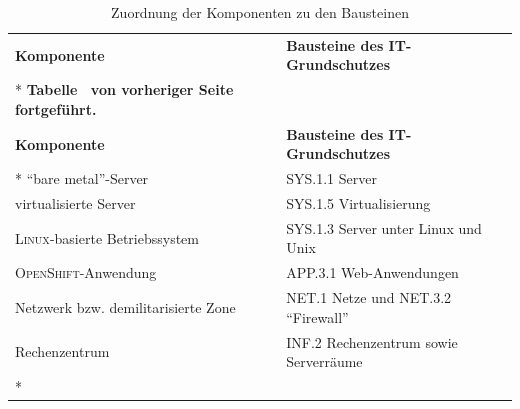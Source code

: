 \begin{longtable}{@{}lp{8.0cm}@{}}
	\toprule[1.5pt]
	\textbf{Komponente} & \textbf{Bausteine des IT-Grundschutzes} \\* \midrule
	\endfirsthead
	\multicolumn{2}{c}%
	{{\bfseries Tabelle \thetable\ von vorheriger Seite fortgeführt.}} \\
	\toprule
	\textbf{Komponente} & \textbf{Bausteine des IT-Grundschutzes} \\* \midrule
	\endhead
	\bottomrule
	\endfoot
	\endlastfoot
	\enquote{bare metal}-Server & SYS.1.1 Server\\
	virtualisierte Server & SYS.1.5 Virtualisierung \\
	\textsc{Linux}-basierte Betriebssystem & SYS.1.3 Server unter Linux und Unix\\
	\textsc{OpenShift}-Anwendung & APP.3.1 Web-Anwendungen\\
	\pagebreak
	Netzwerk bzw. demilitarisierte Zone & NET.1 Netze und NET.3.2 \enquote{Firewall}\\
	Rechenzentrum & INF.2 Rechenzentrum sowie Serverräume\\* 
	
	\bottomrule[1.5pt]
	
	\caption{Zuordnung der Komponenten zu den Bausteinen}\label{tab:zuordnungKompBau}\\
\end{longtable}

